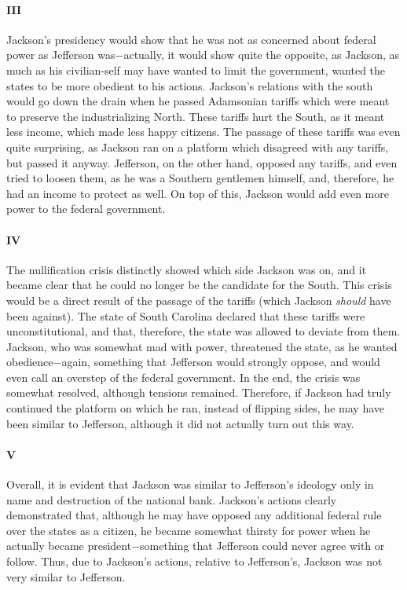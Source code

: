 \documentclass[12pt]{article}
\begin{document}
    \paragraph{III} Jackson's presidency would show that he was not as concerned about federal power as Jefferson was$-$actually, it would show quite the opposite, as Jackson, as much as his civilian-self may have wanted to limit the government, wanted the states to be more obedient to his actions. Jackson's relations with the south would go down the drain when he passed Adamsonian tariffs which were meant to preserve the industrializing North. These tariffs hurt the South, as it meant less income, which made less happy citizens. The passage of these tariffs was even quite surprising, as Jackson ran on a platform which disagreed with any tariffs, but passed it anyway. Jefferson, on the other hand, opposed any tariffs, and even tried to loosen them, as he was a Southern gentlemen himself, and, therefore, he had an income to protect as well. On top of this, Jackson would add even more power to the federal government.

    \paragraph{IV} The nullification crisis distinctly showed which side Jackson was on, and it became clear that he could no longer be the candidate for the South. This crisis would be a direct result of the passage of the tariffs (which Jackson \textit{should} have been against). The state of South Carolina declared that these tariffs were unconstitutional, and that, therefore, the state was allowed to deviate from them. Jackson, who was somewhat mad with power, threatened the state, as he wanted obedience$-$again, something that Jefferson would strongly oppose, and would even call an overstep of the federal government. In the end, the crisis was somewhat resolved, although tensions remained. Therefore, if Jackson had truly continued the platform on which he ran, instead of flipping sides, he may have been similar to Jefferson, although it did not actually turn out this way.

    \paragraph{V} Overall, it is evident that Jackson was similar to Jefferson's ideology only in name and destruction of the national bank. Jackson's actions clearly demonstrated that, although he may have opposed any additional federal rule over the states as a citizen, he became somewhat thirsty for power when he actually became president$-$something that Jefferson could never agree with or follow. Thus, due to Jackson's actions, relative to Jefferson's, Jackson was not very similar to Jefferson. 
\end{document}

